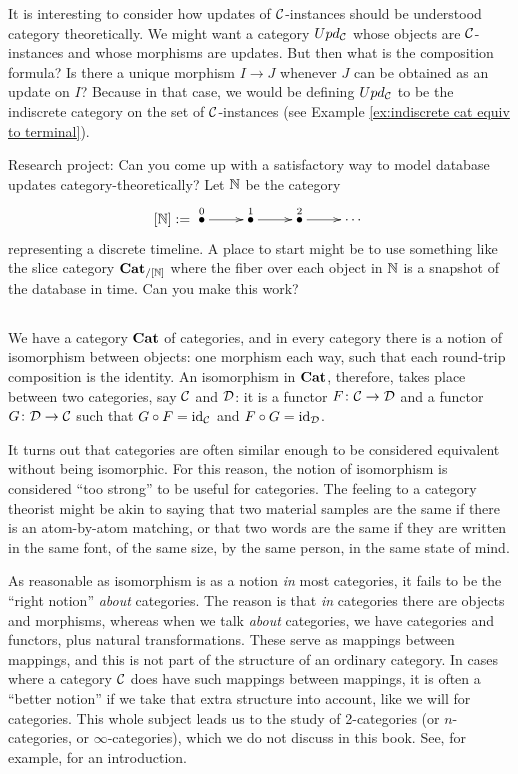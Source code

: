 \documentclass[CT4S-EN-RU]{subfiles}
\begin{document}
It is interesting to consider how updates of $\mathcal{C}$-instances should be understood category theoretically. We might want a category $Upd_\mathcal{C}$ whose objects are $\mathcal{C}$-instances and whose morphisms are updates. But then what is the composition formula? Is there a unique morphism $I\to J$ whenever $J$ can be obtained as an update on $I$? Because in that case, we would be defining $Upd_\mathcal{C}$ to be the indiscrete category on the set of $\mathcal{C}$-instances (see Example \ref{ex:indiscrete cat equiv to terminal}).

\begin{exercise}
Research project: Can you come up with a satisfactory way to model database updates category-theoretically? Let ${\mathbb N}$ be the category
$$[\NN]:=\xymatrix{\LMO{0}\ar[r]&\LMO{1}\ar[r]&\LMO{2}\ar[r]&\cdots}$$ 
representing a discrete timeline. A place to start might be to use something like the slice category ${\bf Cat}_{/[{\mathbb N}]}$ where the fiber over each object in ${\mathbb N}$ is a snapshot of the database in time. Can you make this work?
\end{exercise}



\subsection{}\label{sec:equivalence of cats}

We have a category ${\bf Cat}$ of categories, and in every category there is a notion of isomorphism between objects: one morphism each way, such that each round-trip composition is the identity. An isomorphism in ${\bf Cat}$, therefore, takes place between two categories, say $\mathcal{C}$ and $\mathcal{D}$: it is a functor $F\colon\mathcal{C}\rightarrow\mathcal{D}$ and a functor $G\colon\mathcal{D}\rightarrow\mathcal{C}$ such that $G\circ F=\textnormal{id}_\mathcal{C}$ and $F\circ G=\textnormal{id}_\mathcal{D}$. 

It turns out that categories are often similar enough to be considered equivalent without being isomorphic. For this reason, the notion of isomorphism is considered “too strong” to be useful for categories. The feeling to a category theorist might be akin to saying that two material samples are the same if there is an atom-by-atom matching, or that two words are the same if they are written in the same font, of the same size, by the same person, in the same state of mind. 

As reasonable as isomorphism is as a notion {\em in} most categories, it fails to be the “right notion” {\em about} categories. The reason is that {\em in} categories there are objects and morphisms, whereas when we talk {\em about} categories, we have categories and functors, plus natural transformations. These serve as mappings between mappings, and this is not part of the structure of an ordinary category. In cases where a category $\mathcal{C}$ does have such mappings between mappings, it is often a “better notion” if we take that extra structure into account, like we will for categories. This whole subject leads us to the study of 2-categories (or $n$-categories, or $\infty$-categories), which we do not discuss in this book. See, for example, \cite{Le1} for an introduction.
\end{document}
